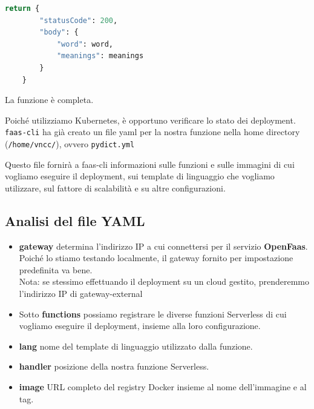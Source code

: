 \documentclass[11pt, a4paper]{article}
\begin{document}

\begin{lstlisting}[language=Python]
    return {
        "statusCode": 200,
        "body": {
            "word": word,
            "meanings": meanings
        }
    }
\end{lstlisting}

La funzione è completa.

Poiché utilizziamo Kubernetes, è opportuno verificare lo stato dei deployment. \texttt{faas-cli} ha già creato un file yaml per la nostra funzione nella home directory (\texttt{/home/vncc/}), ovvero \texttt{pydict.yml}


Questo file fornirà a faas-cli informazioni sulle funzioni e sulle immagini di cui vogliamo eseguire il deployment, sui template di linguaggio che vogliamo utilizzare, sul fattore di scalabilità e su altre configurazioni.

\subsection*{Analisi del file YAML}
\begin{itemize}[noitemsep]
    \item \textbf{gateway} determina l'indirizzo IP a cui connettersi per il servizio \textbf{OpenFaas}. Poiché lo stiamo testando localmente, il gateway fornito per impostazione predefinita va bene. \\
    Nota: se stessimo effettuando il deployment su un cloud gestito, prenderemmo l'indirizzo IP di gateway-external
    \item Sotto \textbf{functions} possiamo registrare le diverse funzioni Serverless di cui vogliamo eseguire il deployment, insieme alla loro configurazione.
    \item \textbf{lang} nome del template di linguaggio utilizzato dalla funzione.
    \item \textbf{handler} posizione della nostra funzione Serverless.
    \item \textbf{image} URL completo del registry Docker insieme al nome dell'immagine e al tag.
\end{itemize}
\end{document}
